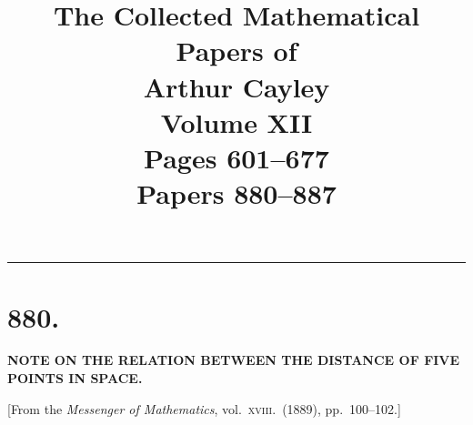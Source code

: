 \documentclass[11pt,a4paper]{article}
\title{\textbf{The Collected Mathematical Papers of\\ Arthur Cayley}\\[6pt]
\Large Volume XII\\[4pt]
\large Pages 601--677\\[8pt]
\normalsize Papers 880--887}
\author{}
\date{}
\theoremstyle{plain}
\theoremstyle{definition}
\begin{document}
\maketitle
\thispagestyle{empty}

\vspace{-1cm}
\begin{center}
\rule{0.8\textwidth}{0.4pt}
\end{center}


\newpage
\section*{880.}

\begin{center}
\textbf{NOTE ON THE RELATION BETWEEN THE DISTANCE OF FIVE POINTS IN SPACE.}
\end{center}

\begin{center}
[From the \textit{Messenger of Mathematics}, vol.\ \textsc{xviii}.\ (1889), pp.\ 100--102.]
\end{center}
\end{document}
